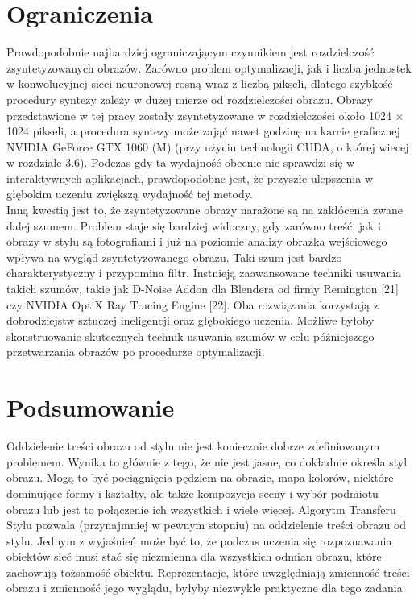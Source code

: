 \documentclass[openright]{xmgr}
\begin{document}
						
\section{Ograniczenia\label{s:dsssl}}

  \indent \indent Prawdopodobnie najbardziej ograniczającym czynnikiem jest rozdzielczość zsyntetyzowanych obrazów. Zarówno problem optymalizacji, jak i liczba jednostek w konwolucyjnej sieci neuronowej rosną wraz z liczbą pikseli, dlatego szybkość procedury syntezy zależy w dużej mierze od rozdzielczości obrazu. Obrazy przedstawione w tej pracy zostały zsyntetyzowane w rozdzielczości około 1024 × 1024 pikseli, a procedura syntezy może zająć nawet godzinę na karcie graficznej NVIDIA GeForce GTX 1060 (M) (przy użyciu technologii CUDA, o której wiecej w rozdziale 3.6). Podczas gdy ta wydajność obecnie nie sprawdzi się w interaktywnych aplikacjach, prawdopodobne jest, że przyszłe ulepszenia w głębokim uczeniu zwiększą wydajność tej metody.
\\

Inną kwestią jest to, że zsyntetyzowane obrazy narażone są na zakłócenia zwane dalej szumem.  Problem staje się bardziej widoczny, gdy zarówno treść, jak i obrazy w stylu są fotografiami i już na poziomie analizy obrazka wejściowego wpływa na wygląd zsyntetyzowanego obrazu. Taki szum jest bardzo charakterystyczny i przypomina filtr. Instnieją zaawansowane techniki usuwania takich szumów, takie jak D-Noise Addon dla Blendera od firmy Remington [21] czy NVIDIA OptiX Ray Tracing Engine [22]. Oba rozwiązania korzystają z dobrodziejstw sztuczej ineligencji oraz głębokiego uczenia. Możliwe byłoby skonstruowanie skutecznych technik usuwania szumów w celu późniejszego przetwarzania obrazów po procedurze optymalizacji.

\section{Podsumowanie\label{s:dsssl}}

  \indent \indent Oddzielenie treści obrazu od stylu nie jest koniecznie dobrze zdefiniowanym problemem. Wynika to głównie z tego, że nie jest jasne, co dokładnie określa styl obrazu. Mogą to być pociągnięcia pędzlem na obrazie, mapa kolorów, niektóre dominujące formy i kształty, ale także kompozycja sceny i wybór podmiotu obrazu lub jest to połączenie ich wszystkich i wiele więcej. Algorytm Transferu Stylu pozwala (przynajmniej w pewnym stopniu) na oddzielenie treści obrazu od stylu. Jednym z wyjaśnień może być to, że podczas uczenia się rozpoznawania obiektów sieć musi stać się niezmienna dla wszystkich odmian obrazu, które zachowują tożsamość obiektu. Reprezentacje, które uwzględniają zmienność treści obrazu i zmienność jego wyglądu, byłyby niezwykle praktyczne dla tego zadania.
\end{document}
